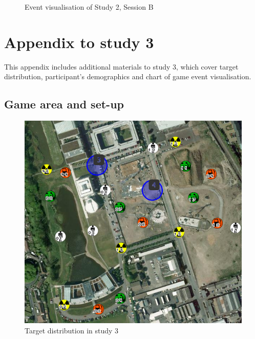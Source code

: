 \begin{figure}[H]
  \centering
  \caption{Event visualisation of Study 2, Session B}
 
\end{figure}

\chapter{Appendix to study 3}
This appendix includes additional materials to study 3, which cover target distribution, participant's demographics and chart of game event visualisation.

\section{Game area and set-up}
\begin{figure}[H]
  \centering
  \includegraphics[width=1\textwidth]{img/Appendix/targets2}
  \caption{Target distribution in study 3}
\end{figure}


